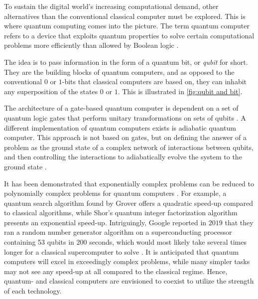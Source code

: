 To sustain the digital world's increasing computational demand, other alternatives than the conventional classical computer must be explored. This is where quantum computing comes into the picture. The term quantum computer refers to a device that exploits quantum properties to solve certain computational problems more efficiently than allowed by Boolean logic \cite{Weber2010}.

The idea is to pass information in the form of a quantum bit, or \textit{qubit} for short. They are the building blocks of quantum computers, and as opposed to the conventional $0$ or $1$-bits that classical computers are based on, they can inhabit any superposition of the states $0$ or $1$. This is illustrated in \autoref{fig:qubit and bit}.


The architecture of a gate-based quantum computer is dependent on a set of quantum logic gates that perform unitary transformations on sets of qubits \cite{DiVincenzo2000, Ladd2010}. A different implementation of quantum computers exists is adiabatic quantum computer. This approach is not based on gates, but on defining the answer of a problem as the ground state of a complex network of interactions between qubits, and then controlling the interactions to adiabatically evolve the system to the ground state \cite{Mizel2007}.



It has been demonstrated that exponentially complex problems can be reduced to polynomially complex problems for quantum computers \cite{Pavicic2006}. For example, a quantum search algorithm found by Grover \cite{Grover1997} offers a quadratic speed-up compared to classical algorithms, while Shor's quantum integer factorization algorithm \cite{Shor1994} presents an exponential speed-up. Intriguingly, Google reported in $2019$ that they ran a random number generator algorithm on a superconducting processor containing 53 qubits in $200$ seconds, which would most likely take several times longer for a classical supercomputer to solve \cite{Martinis2019}. It is anticipated that quantum computers will excel in exceedingly complex problems, while many simpler tasks may not see any speed-up at all compared to the classical regime. Hence, quantum- and classical computers are envisioned to coexist to utilize the strength of each technology.

